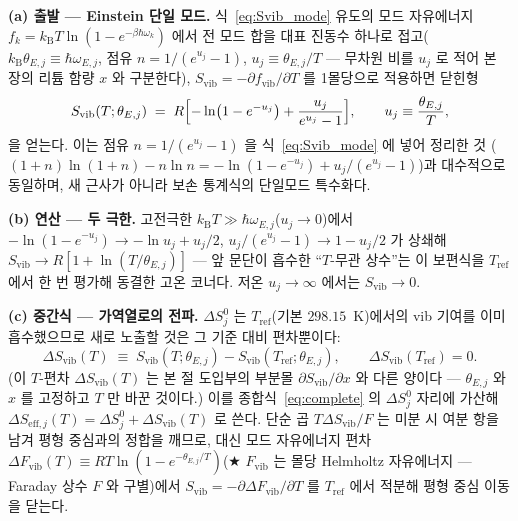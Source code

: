 \documentclass[11pt,a4paper]{article}
\newcommand{\vib}{\mathrm{vib}}
\newcommand{\eff}{\mathrm{eff}}
\newcommand{\kB}{k_{\mathrm B}}
\begin{document}
\textbf{(a) 출발 --- Einstein 단일 모드.} 식~\eqref{eq:Svib_mode} 유도의 모드 자유에너지
$f_k=\kB T\ln(1-e^{-\beta\hbar\omega_k})$ 에서 전 모드 합을 대표 진동수 하나로 접고($\kB\theta_{E,j}\equiv\hbar\omega_{E,j}$,
점유 $n=1/(e^{u_j}-1)$, $u_j\equiv\theta_{E,j}/T$ --- 무차원 비를 $u_j$ 로 적어 본 장의 리튬 함량 $x$ 와 구분한다),
$S_\vib=-\partial f_\vib/\partial T$ 를 1몰당으로 적용하면 닫힌형
\begin{equation}
S_\vib(T;\theta_{E,j}) \;=\; R\Bigl[-\ln\bigl(1-e^{-u_j}\bigr)+\frac{u_j}{e^{u_j}-1}\Bigr],
\qquad u_j\equiv\frac{\theta_{E,j}}{T},
\label{eq:Svib-einstein}
\end{equation}
을 얻는다. 이는 점유 $n=1/(e^{u_j}-1)$ 을 식~\eqref{eq:Svib_mode} 에 넣어 정리한 것
($(1+n)\ln(1+n)-n\ln n=-\ln(1-e^{-u_j})+u_j/(e^{u_j}-1)$)과 대수적으로 동일하며, 새 근사가 아니라 보손
통계식의 단일모드 특수화다.

\textbf{(b) 연산 --- 두 극한.} 고전극한 $\kB T\gg\hbar\omega_{E,j}$($u_j\to0$)에서 $-\ln(1-e^{-u_j})\to-\ln u_j+u_j/2$,
$u_j/(e^{u_j}-1)\to1-u_j/2$ 가 상쇄해 $S_\vib\to R[1+\ln(T/\theta_{E,j})]$ --- 앞 문단이 흡수한 ``$T$-무관 상수''는
이 보편식을 $T_\mathrm{ref}$ 에서 한 번 평가해 동결한 고온 코너다. 저온 $u_j\to\infty$ 에서는 $S_\vib\to0$.

\textbf{(c) 중간식 --- 가역열로의 전파.} $\Delta S^0_j$ 는 $T_\mathrm{ref}$(기본 $298.15$~K)에서의 vib 기여를 이미
흡수했으므로 새로 노출할 것은 그 기준 대비 편차뿐이다:
\begin{equation}
\Delta S_\vib(T) \;\equiv\; S_\vib(T;\theta_{E,j})-S_\vib(T_\mathrm{ref};\theta_{E,j}),
\qquad \Delta S_\vib(T_\mathrm{ref})=0.
\label{eq:dSvib}
\end{equation}
(이 $T$-편차 $\Delta S_\vib(T)$ 는 본 절 도입부의 부분몰 $\partial S_\vib/\partial x$ 와 다른 양이다 --- $\theta_{E,j}$ 와 $x$ 를
고정하고 $T$ 만 바꾼 것이다.) 이를 종합식~\eqref{eq:complete} 의 $\Delta S^0_j$ 자리에 가산해 $\Delta S_{\eff,j}(T)=\Delta S^0_j+\Delta S_\vib(T)$
로 쓴다. 단순 곱 $T\Delta S_\vib/F$ 는 미분 시 여분 항을 남겨 평형 중심과의 정합을 깨므로, 대신 모드 자유에너지
편차 $\Delta F_\vib(T)\equiv RT\ln(1-e^{-\theta_{E,j}/T})$(★ $F_\vib$ 는 몰당 Helmholtz 자유에너지 --- Faraday
상수 $F$ 와 구별)에서 $S_\vib=-\partial\Delta F_\vib/\partial T$ 를 $T_\mathrm{ref}$ 에서 적분해 평형 중심 이동을 닫는다.
\end{document}
